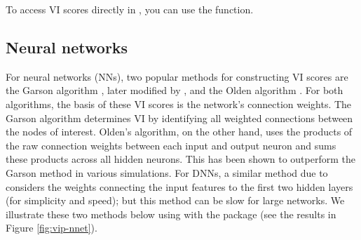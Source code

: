 To access VI scores directly in , you can use the
 function.

\hypertarget{neural-networks}{%
\subsection{Neural networks}\label{neural-networks}}

For neural networks (NNs), two popular methods for constructing VI
scores are the Garson algorithm \citep{interpreting-garson-1991}, later
modified by \citet{back-goh-1995}, and the Olden algorithm
\citep{accurate-olden-2004}. For both algorithms, the basis of these VI
scores is the network's connection weights. The Garson algorithm
determines VI by identifying all weighted connections between the nodes
of interest. Olden's algorithm, on the other hand, uses the products of
the raw connection weights between each input and output neuron and sums
these products across all hidden neurons. This has been shown to
outperform the Garson method in various simulations. For DNNs, a similar
method due to \citet{data-gedeon-1997} considers the weights connecting
the input features to the first two hidden layers (for simplicity and
speed); but this method can be slow for large networks. We illustrate
these two methods below using  with the 
package \citep{R-nnet} (see the results in Figure \ref{fig:vip-nnet}).

